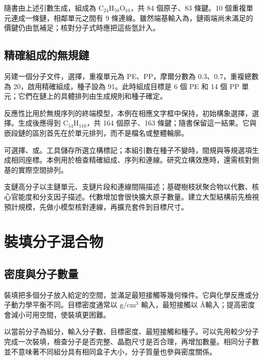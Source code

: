 隨書由上述引數生成，組成為 $\mathrm{C_{24}H_{50}O_{10}}$，共 84 個原子、83 條鍵。10 個重複單元連成一條鏈，相鄰單元之間有 9 條連線。雖然端基輸入為，鏈兩端尚未滿足的價鍵仍由氫補足；核對分子式時應把這些氫計入。



\subsection{精確組成的無規鏈}

另建一個分子文件，選擇，重複單元為 PE、PP，摩爾分數為 0.3、0.7，重複總數為 20，啟用精確組成，種子設為 91。此時組成目標是 6 個 PE 和 14 個 PP 單元；它們在鏈上的具體排列由生成規則和種子確定。

反應性比用於無規序列的終端模型，本例在相應文字框中保持，初始構象選擇，選擇。生成後應得到 $\mathrm{C_{54}H_{110}}$，共 164 個原子、163 條鍵；隨書保留這一結果。它與嵌段鏈的區別首先在於單元排列，而不是檔名或整體輪廓。

可選擇、或。工具儲存所選立構標記；本組引數在種子不變時，間規與等規選項生成相同座標。本例用於檢查精確組成、序列和連線。研究立構效應時，還需核對側基的實際空間排列。

支鏈高分子以主鏈單元、支鏈片段和連線間隔描述；基礎樹枝狀聚合物以代數、核心官能度和分支因子描述。代數增加會很快擴大原子數量。建立大型結構前先檢視預計規模，先做小模型核對連線，再擴充套件到目標尺寸。

\section{裝填分子混合物}

\subsection{密度與分子數量}

裝填把多個分子放入給定的空間，並滿足最短接觸等幾何條件。它與化學反應或分子動力學平衡不同。目標密度通常以 $\mathrm{g/cm^3}$ 輸入，最短接觸以 \AA 輸入；提高密度會減小可用空間，使裝填更困難。

以當前分子為組分，輸入分子數、目標密度、最短接觸和種子。可以先用較少分子完成一次裝填，檢查分子是否完整、晶胞尺寸是否合理，再增加數量。相同分子數並不意味著不同組分具有相同盒子大小，分子質量也參與密度關係。

